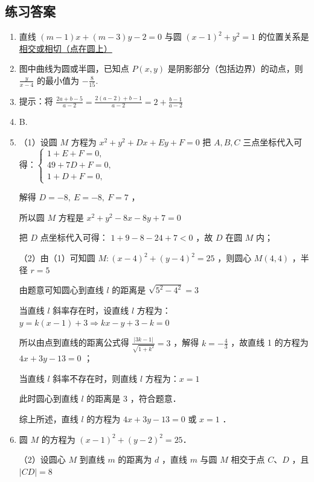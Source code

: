 \subsection{练习答案}
\begin{tips}
    \begin{enumerate}
        \item 直线 $(m-1) x+(m-3) y-2=0$ 与圆 $(x-1)^2+y^2=1$ 的位置关系是 \underline{相交或相切（点在圆上）}
        \item 图中曲线为圆或半圆，已知点 $P(x, y)$ 是阴影部分（包括边界）的动点，则 $\frac{y}{x-4}$ 的最小值为 $-\frac{8}{15}$.
        \item 提示：将 $\frac{2 a+b-5}{a-2}=\frac{2(a-2)+b-1}{a-2}=2+\frac{b-1}{a-2}$
        \item B.
        \item（1）设圆 $M$ 方程为 $x^2+y^2+D x+E y+F=0$
              把 $A, B, C$ 三点坐标代入可得：$\left\{\begin{array}{l}1+E+F=0, \\ 49+7 D+F=0, \\ 1+D+F=0,\end{array}\right.$

              解得 $D=-8, ~ E=-8, ~ F=7$ ，

              所以圆 $M$ 方程是 $x^2+y^2-8 x-8 y+7=0$

              把 $D$ 点坐标代入可得： $1+9-8-24+7<0$ ，故 $D$ 在圆 $M$ 内；

              （2）由（1）可知圆 $M:(x-4)^2+(y-4)^2=25$ ，则圆心 $M(4,4)$ ，半径 $r=5$

              由题意可知圆心到直线 $l$ 的距离是 $\sqrt{5^2-4^2}=3$

              当直线 $l$ 斜率存在时，设直线 $l$ 方程为：$y=k(x-1)+3 \Rightarrow k x-y+3-k=0$

              所以由点到直线的距离公式得 $\frac{|3 k-1|}{\sqrt{1+k^2}}=3$ ，解得 $k=-\frac{4}{3}$ ，故直线 1 的方程为 $4 x+3 y-13=0$ ；

              当直线 $l$ 斜率不存在时，则直线 $l$ 方程为：$x=1$

              此时圆心到直线 $l$ 的距离是 3 ，符合题意．

              综上所述，直线 $l$ 的方程为 $4 x+3 y-13=0$ 或 $x=1$ ．

        \item 圆 $M$ 的方程为 $(x-1)^2+(y-2)^2=25$．

              （2）设圆心 $M$ 到直线 $m$ 的距离为 $d$ ，直线 $m$ 与圆 $M$ 相交于点 $C$、$D$ ，且 $|C D|=8$


\end{enumerate}
\end{tips}
